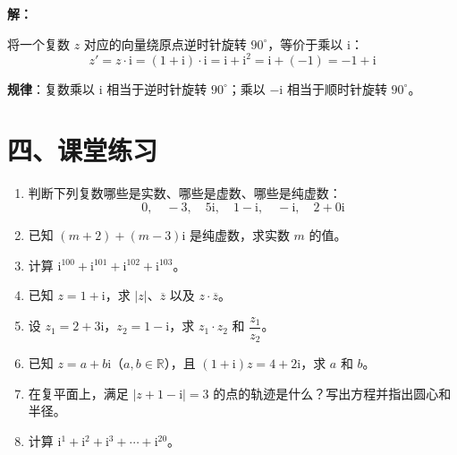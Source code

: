 \documentclass[12pt, a4paper]{ctexart}
\begin{document}
\textbf{解：}

将一个复数 $z$ 对应的向量绕原点逆时针旋转 $90^{\circ}$，等价于乘以 $\mathrm{i}$：
\[
z' = z \cdot \mathrm{i} = (1 + \mathrm{i}) \cdot \mathrm{i} = \mathrm{i} + \mathrm{i}^2 = \mathrm{i} + (-1) = -1 + \mathrm{i}
\]

\begin{center}
\end{center}

\textbf{规律}：复数乘以 $\mathrm{i}$ 相当于逆时针旋转 $90^{\circ}$；乘以 $-\mathrm{i}$ 相当于顺时针旋转 $90^{\circ}$。


\section*{\textcolor{tipgreen}{四、课堂练习}}

\begin{enumerate}[leftmargin=2em]

  \item 判断下列复数哪些是实数、哪些是虚数、哪些是纯虚数：
  \[
    0,\quad -3,\quad 5\mathrm{i},\quad 1-\mathrm{i},\quad -\mathrm{i},\quad 2+0\mathrm{i}
  \]

  \item 已知 $(m+2) + (m-3)\mathrm{i}$ 是纯虚数，求实数 $m$ 的值。

  \item 计算 $\mathrm{i}^{100} + \mathrm{i}^{101} + \mathrm{i}^{102} + \mathrm{i}^{103}$。

  \item 已知 $z = 1 + \mathrm{i}$，求 $|z|$、$\overline{z}$ 以及 $z \cdot \overline{z}$。

  \item 设 $z_1 = 2 + 3\mathrm{i}$，$z_2 = 1 - \mathrm{i}$，求 $z_1 \cdot z_2$ 和 $\dfrac{z_1}{z_2}$。

  \item 已知 $z = a + b\mathrm{i}$（$a, b \in \mathbb{R}$），且 $(1 + \mathrm{i})z = 4 + 2\mathrm{i}$，求 $a$ 和 $b$。

  \item 在复平面上，满足 $|z + 1 - \mathrm{i}| = 3$ 的点的轨迹是什么？写出方程并指出圆心和半径。

  \item 计算 $\mathrm{i}^{1} + \mathrm{i}^{2} + \mathrm{i}^{3} + \cdots + \mathrm{i}^{20}$。

\end{enumerate}
\end{document}
